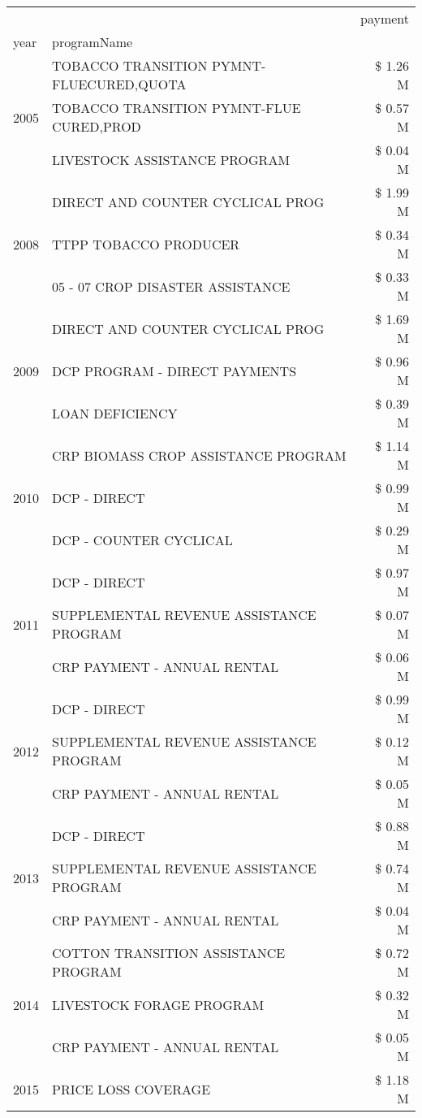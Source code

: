 \begin{tabular}{llr}
\toprule
 &  & payment \\
year & programName &  \\
\midrule
\multirow[t]{3}{*}{2005} & TOBACCO TRANSITION PYMNT-FLUECURED,QUOTA & \$ 1.26 M \\
 & TOBACCO TRANSITION PYMNT-FLUE CURED,PROD & \$ 0.57 M \\
 & LIVESTOCK ASSISTANCE PROGRAM & \$ 0.04 M \\
\cline{1-3}
\multirow[t]{3}{*}{2008} & DIRECT AND COUNTER CYCLICAL PROG & \$ 1.99 M \\
 & TTPP TOBACCO PRODUCER & \$ 0.34 M \\
 & 05 - 07 CROP DISASTER ASSISTANCE & \$ 0.33 M \\
\cline{1-3}
\multirow[t]{3}{*}{2009} & DIRECT AND COUNTER CYCLICAL PROG & \$ 1.69 M \\
 & DCP PROGRAM - DIRECT PAYMENTS & \$ 0.96 M \\
 & LOAN DEFICIENCY & \$ 0.39 M \\
\cline{1-3}
\multirow[t]{3}{*}{2010} & CRP BIOMASS CROP ASSISTANCE PROGRAM & \$ 1.14 M \\
 & DCP - DIRECT & \$ 0.99 M \\
 & DCP - COUNTER CYCLICAL & \$ 0.29 M \\
\cline{1-3}
\multirow[t]{3}{*}{2011} & DCP - DIRECT & \$ 0.97 M \\
 & SUPPLEMENTAL REVENUE ASSISTANCE PROGRAM & \$ 0.07 M \\
 & CRP PAYMENT - ANNUAL RENTAL & \$ 0.06 M \\
\cline{1-3}
\multirow[t]{3}{*}{2012} & DCP - DIRECT & \$ 0.99 M \\
 & SUPPLEMENTAL REVENUE ASSISTANCE PROGRAM & \$ 0.12 M \\
 & CRP PAYMENT - ANNUAL RENTAL & \$ 0.05 M \\
\cline{1-3}
\multirow[t]{3}{*}{2013} & DCP - DIRECT & \$ 0.88 M \\
 & SUPPLEMENTAL REVENUE ASSISTANCE PROGRAM & \$ 0.74 M \\
 & CRP PAYMENT - ANNUAL RENTAL & \$ 0.04 M \\
\cline{1-3}
\multirow[t]{3}{*}{2014} & COTTON TRANSITION ASSISTANCE PROGRAM & \$ 0.72 M \\
 & LIVESTOCK FORAGE PROGRAM & \$ 0.32 M \\
 & CRP PAYMENT - ANNUAL RENTAL & \$ 0.05 M \\
\cline{1-3}
\multirow[t]{3}{*}{2015} & PRICE LOSS COVERAGE & \$ 1.18 M \\

\end{tabular}
